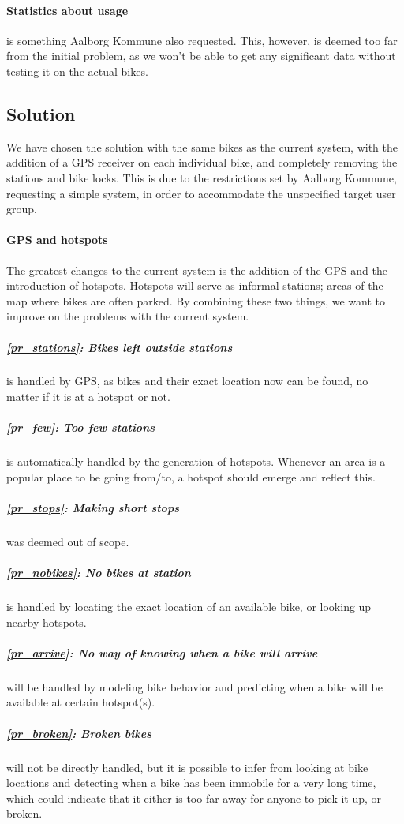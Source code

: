 \paragraph{Statistics about usage} is something Aalborg Kommune also requested.
This, however, is deemed too far from the initial problem, as we won't be able to get any significant data without testing it on the actual bikes.

\subsection{Solution} \label{prob_statement:solution}
We have chosen the solution with the same bikes as the current system, with the addition of a GPS receiver on each individual bike, and completely removing the stations and bike locks.
This is due to the restrictions set by Aalborg Kommune, requesting a simple system, in order to accommodate the unspecified target user group.

\paragraph{GPS and hotspots}
The greatest changes to the current system is the addition of the GPS and the introduction of hotspots.
Hotspots will serve as informal stations; areas of the map where bikes are often parked.
By combining these two things, we want to improve on the problems with the current system.

\subparagraph{\ref{pr_stations}: Bikes left outside stations} is handled by GPS, as bikes and their exact location now can be found, no matter if it is at a hotspot or not.

\subparagraph{\ref{pr_few}: Too few stations} is automatically handled by the generation of hotspots.
Whenever an area is a popular place to be going from/to, a hotspot should emerge and reflect this.

\subparagraph{\ref{pr_stops}: Making short stops} was deemed out of scope.

\subparagraph{\ref{pr_nobikes}: No bikes at station} is handled by locating the exact location of an available bike, or looking up nearby hotspots.

\subparagraph{\ref{pr_arrive}: No way of knowing when a bike will arrive} will be handled by modeling bike behavior and predicting when a bike will be available at certain hotspot(s).

\subparagraph{\ref{pr_broken}: Broken bikes} will not be directly handled, but it is possible to infer from looking at bike locations and detecting when a bike has been immobile for a very long time, which could indicate that it either is too far away for anyone to pick it up, or broken.

